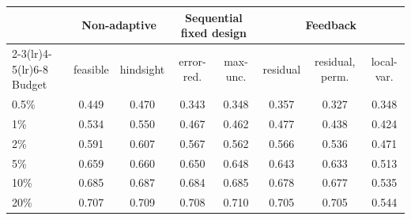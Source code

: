 \begin{tabular}{lccccccc}
\toprule
 & \multicolumn{2}{c}{Non-adaptive} & \multicolumn{2}{c}{Sequential fixed design} & \multicolumn{3}{c}{Feedback} \\
\cmidrule(lr){2-3}\cmidrule(lr){4-5}\cmidrule(lr){6-8}
Budget & feasible & hindsight & error-red. & max-unc. & residual & residual, perm. & local-var. \\
\midrule
0.5\% & 0.449 & 0.470 & 0.343 & 0.348 & 0.357 & 0.327 & 0.348 \\
1\% & 0.534 & 0.550 & 0.467 & 0.462 & 0.477 & 0.438 & 0.424 \\
2\% & 0.591 & 0.607 & 0.567 & 0.562 & 0.566 & 0.536 & 0.471 \\
5\% & 0.659 & 0.660 & 0.650 & 0.648 & 0.643 & 0.633 & 0.513 \\
10\% & 0.685 & 0.687 & 0.684 & 0.685 & 0.678 & 0.677 & 0.535 \\
20\% & 0.707 & 0.709 & 0.708 & 0.710 & 0.705 & 0.705 & 0.544 \\
\bottomrule
\end{tabular}